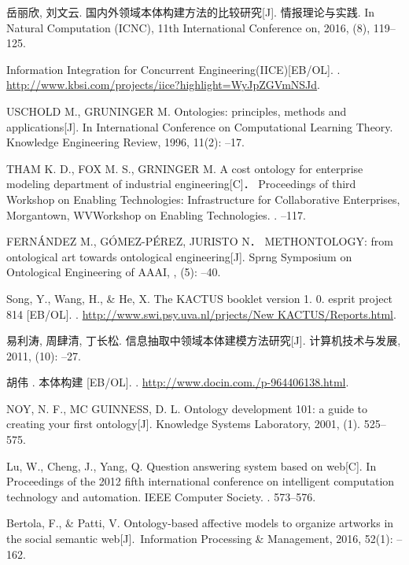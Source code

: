 \begin{thebibliography}{10}
岳丽欣, 刘文云.
\newblock 国内外领域本体构建方法的比较研究[J]. 情报理论与实践.
\newblock In Natural Computation (ICNC), 11th International Conference on, 2016,
(8), 119--125.

\newblock Information Integration for Concurrent Engineering(IICE)[EB/OL].
.
\newblock
\url{http://www.kbsi.com/projects/iice?highlight=WyJpZGVmNSJd}.

USCHOLD M., GRUNINGER M.
\newblock  Ontologies: principles, methods and applications[J].
\newblock In International Conference on Computational Learning Theory.
\newblock Knowledge Engineering Review, 1996, 11(2):
--17.

THAM K. D., FOX M. S., GRNINGER M. 
\newblock A cost ontology for enterprise modeling department of industrial engineering[C]．
\newblock Proceedings of third Workshop on Enabling Technologies: Infrastructure for Collaborative Enterprises, Morgantown, WVWorkshop on Enabling Technologies.
.
--117.

FERN{\'A}NDEZ M., G{\'O}MEZ-P{\'E}REZ, JURISTO N．
\newblock METHONTOLOGY: from ontological art towards ontological engineering[J].
\newblock Sprng Symposium on Ontological Engineering of AAAI, 
, (5):
--40.

Song, Y., Wang, H., \& He, X.
\newblock The KACTUS booklet version 1. 0. esprit project 814 [EB/OL].
.
\newblock
\url{http://www.swi.psy.uva.nl/prjects/New KACTUS/Reports.html}.

易利涛, 周肆清, 丁长松.
\newblock 信息抽取中领域本体建模方法研究[J].
\newblock 计算机技术与发展, 2011, (10):
--27.

胡伟 . 
\newblock 本体构建 [EB/OL].
.
\newblock
\url{http://www.docin.com./p-964406138.html}.

NOY, N. F., MC GUINNESS, D. L. 
\newblock Ontology development 101: a guide to creating your first ontology[J].
\newblock Knowledge Systems Laboratory, 2001, 
(1). 525--575.

Lu, W., Cheng, J., Yang, Q. 
\newblock Question answering system based on web[C].
\newblock In Proceedings of the 2012 fifth international conference on intelligent computation technology and automation. IEEE Computer Society.
. 573--576. 

Bertola, F., \& Patti, V.
\newblock Ontology-based affective models to organize artworks in the social semantic web[J]. Information Processing \& Management, 2016, 52(1):
--162.


\end{thebibliography}
